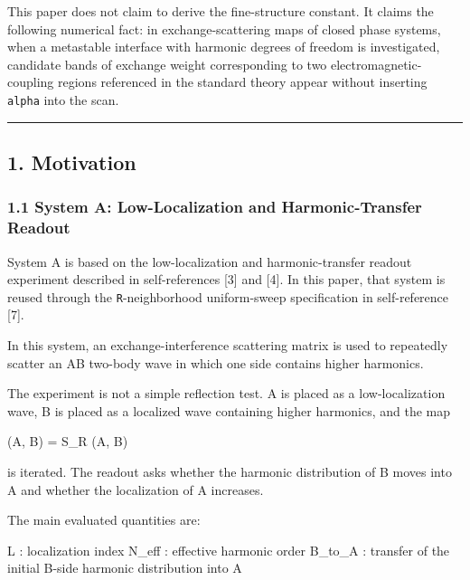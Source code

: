 \documentclass[
]{article}
\newenvironment{Shaded}{}{}
\newcommand{\NormalTok}[1]{#1}
\begin{document}
This paper does not claim to derive the fine-structure constant. It
claims the following numerical fact: in exchange-scattering maps of
closed phase systems, when a metastable interface with harmonic degrees
of freedom is investigated, candidate bands of exchange weight
corresponding to two electromagnetic-coupling regions referenced in the
standard theory appear without inserting \texttt{alpha} into the scan.

\begin{center}\rule{0.5\linewidth}{0.5pt}\end{center}

\subsection{1. Motivation}\label{motivation}

\subsubsection{1.1 System A: Low-Localization and Harmonic-Transfer
Readout}\label{system-a-low-localization-and-harmonic-transfer-readout}

System A is based on the low-localization and harmonic-transfer readout
experiment described in self-references {[}3{]} and {[}4{]}. In this
paper, that system is reused through the \texttt{R}-neighborhood
uniform-sweep specification in self-reference {[}7{]}.

In this system, an exchange-interference scattering matrix is used to
repeatedly scatter an AB two-body wave in which one side contains higher
harmonics.

The experiment is not a simple reflection test. A is placed as a
low-localization wave, B is placed as a localized wave containing higher
harmonics, and the map

\begin{Shaded}
\begin{Highlighting}[]
\NormalTok{(A\textquotesingle{}, B\textquotesingle{}) = S\_R (A, B)}
\end{Highlighting}
\end{Shaded}

is iterated. The readout asks whether the harmonic distribution of B
moves into A and whether the localization of A increases.

The main evaluated quantities are:

\begin{Shaded}
\begin{Highlighting}[]
\NormalTok{L        : localization index}
\NormalTok{N\_eff    : effective harmonic order}
\NormalTok{B\_to\_A   : transfer of the initial B{-}side harmonic distribution into A}
\end{Highlighting}
\end{Shaded}
\end{document}
